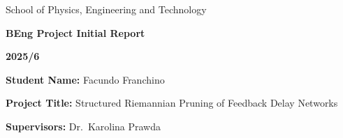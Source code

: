 \documentclass[12pt,a4paper]{article}
\begin{document}
\begin{titlepage}
\thispagestyle{empty}
\sffamily

\begin{center}
\vspace*{3.7cm}
{\Large School of Physics, Engineering and Technology}

\vspace{3.1cm}
{\fontsize{24}{28}\selectfont \textbf{BEng Project Initial Report}}

\vspace{1.3cm}
{\fontsize{22}{26}\selectfont \textbf{2025/6}}
\end{center}

\vfill
\noindent\textbf{Student Name:} Facundo Franchino

\vspace{1.2cm}
\noindent\textbf{Project Title:} Structured Riemannian Pruning of Feedback Delay Networks

\vspace{1.2cm}
\noindent\textbf{Supervisors:} Dr.\ Karolina Prawda

\end{titlepage}
\end{document}

